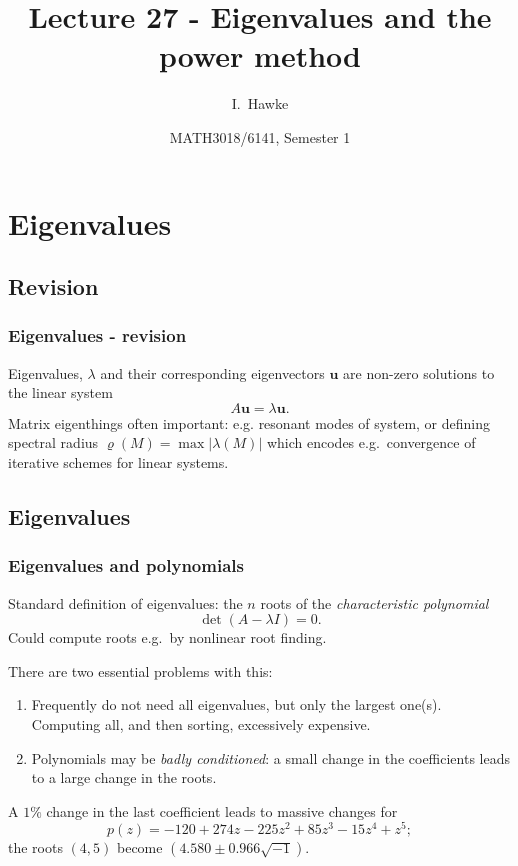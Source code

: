 \documentclass{beamer}
\title[Lecture 27] %
{Lecture 27 - Eigenvalues and the power method}
\author[I.~Hawke] %
{I.~Hawke}
\institute[University of Southampton] %
{
  School of Mathematics, \\
  University of Southampton, UK
}
\date[Semester 1] %
{MATH3018/6141, Semester 1}
\begin{document}
\begin{frame}
  \titlepage
\end{frame}


\section{Eigenvalues}

\subsection{Revision}

\begin{frame}
  \frametitle{Eigenvalues - revision}

  Eigenvalues, $\lambda$ and their corresponding eigenvectors
  $\boldsymbol{u}$ are non-zero solutions to the linear system
  \begin{equation*}
    A\boldsymbol{u} = \lambda \boldsymbol{u}.
  \end{equation*}
  \pause
  Matrix eigenthings often important: e.g. resonant modes of system, or defining spectral radius $\varrho(M) = \max | \lambda(M) |$ which encodes e.g.\ convergence of iterative schemes for linear systems.

\end{frame}

\subsection{Eigenvalues}

\begin{frame}
  \frametitle{Eigenvalues and polynomials}

  Standard definition of eigenvalues: the $n$ roots of
  the \emph{characteristic polynomial}
  \begin{equation*}
    \det ( A - \lambda I) = 0.
  \end{equation*}
  Could compute roots e.g.\ by nonlinear root finding. \pause

  \vspace{1ex}

  There are two essential problems with this:
  \begin{enumerate}
  \item Frequently do not need all eigenvalues, but only the largest
    one(s). Computing all, and then sorting, excessively
    expensive. \pause
  \item Polynomials may be \emph{badly conditioned}: a small change in
    the coefficients leads to a large change in the roots.
  \end{enumerate} \pause

  \vspace{1ex}

  A $1\%$ change in the last coefficient leads to massive changes for
  \begin{equation*}
    p(z) = -120 + 274 z - 225 z^2 + 85 z^3 -15 z^4 + z^5;
  \end{equation*}
  the roots $(4, 5)$ become $(4.580 \pm 0.966 \sqrt{-1})$.

\end{frame}
\end{document}

